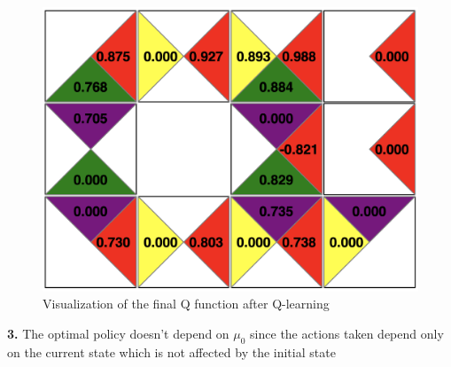 \documentclass[11pt, oneside]{article}   	%
\begin{document}
\begin{figure}[h!]
\begin{center}
\includegraphics[width=.5\linewidth]{q_final.png}
\caption{Visualization of the final Q function after Q-learning}
\label{default}
\end{center}
\end{figure}



\textbf{3.} The optimal policy doesn't depend on $\mu_0$ since the actions taken depend only on the current state which is not affected by the initial state
\end{document}
